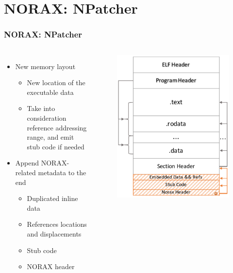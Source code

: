 \documentclass[aspectratio=169]{beamer}
\begin{document}

\section{NORAX: NPatcher}
\begin{frame}
\frametitle{NORAX: NPatcher}
\begin{columns}[c]
\begin{itemize}
\item New memory layout
	\begin{itemize}
		\item New location of the executable data
		\item Take into consideration reference addressing range, and emit stub code if needed
	\end{itemize}
\item Append NORAX-related metadata to the end
	\begin{itemize}
		\item Duplicated inline data
		\item References locations and displacements
		\item Stub code
		\item NORAX header
	\end{itemize}
\end{itemize}
\begin{figure}
\includegraphics[width=1.0\linewidth]{figures/npatcher.pdf}
\end{figure}
\end{columns}
\end{frame}
\end{document}
